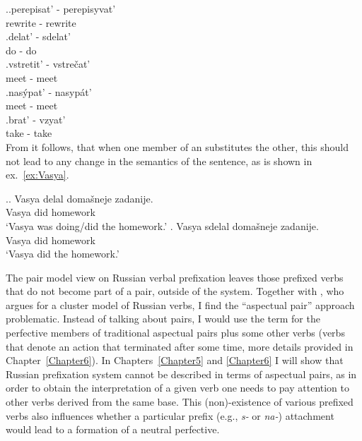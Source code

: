 \ex.\ag.\label{pair1}perepisat' - perepisyvat'\\
rewrite\textsuperscript{\PF} - rewrite\textsuperscript{\IPF}\\
\bg.\label{pair2}delat' - sdelat'\\
do\textsuperscript{\IPF} - do\textsuperscript{\PF}\\
\bg.\label{pair3}vstretit' - vstre\v{c}at'\\
meet\textsuperscript{\PF} - meet\textsuperscript{\IPF}\\
\bg.\label{pair4}nas\'ypat' - nasyp\'at'\\
meet\textsuperscript{\PF} - meet\textsuperscript{\IPF}\\
\bg.\label{pair5}brat' - vzyat'\\
take\textsuperscript{\IPF} - take\textsuperscript{\PF}\\

From  it follows, that when one member of an  substitutes the other, this should not lead to any change in the semantics of the sentence, as is shown in ex.~\ref{ex:Vasya}.

\ex.\label{ex:Vasya}\ag. Vasya delal {doma\v{s}neje zadanije}.\\
Vasya did\textsuperscript{\IPF} homework\\
\trans `Vasya was doing/did the homework.'
\bg. Vasya sdelal {doma\v{s}neje zadanije}.\\
Vasya did\textsuperscript{\PF} homework\\
\trans `Vasya did the homework.'

The pair model view on Russian verbal prefixation leaves those prefixed verbs that do not become part of a pair, outside of the system. Together with \citet{Janda:07a}, who argues for a cluster model of Russian verbs, I find the ``aspectual pair'' approach problematic. Instead of talking about pairs, I would use the term \textit{} for the perfective members of traditional aspectual pairs plus some other verbs (verbs that denote an action that terminated after some time, more details provided in Chapter~\ref{Chapter6}). In Chapters~\ref{Chapter5} and \ref{Chapter6} I will show that Russian prefixation system cannot be described in terms of aspectual pairs, as in order to obtain the interpretation of a given verb one needs to pay attention to other verbs derived from the same base. This (non)-existence of various prefixed verbs also influences whether a particular prefix (e.g., \textit{s-} or \textit{na-}) attachment would lead to a formation of a neutral perfective.

